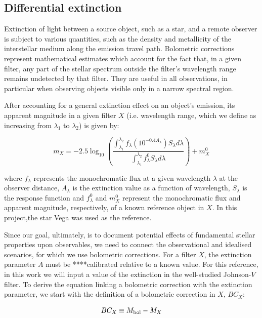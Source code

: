 \documentclass[usenatbib]{mnras}
\begin{document}
\subsection{Differential extinction}
Extinction of light between a source object, such as a star, and a remote observer is subject to various quantities, such as the density and metallicity of the interstellar medium along the emission travel path. Bolometric corrections represent mathematical estimates which account for the fact that, in a given filter, any part of the stellar spectrum outside the filter's wavelength range remains undetected by that filter. They are useful in all observations, in particular when observing objects visible only in a narrow spectral region.

After accounting for a general extinction effect on an object's emission, its apparent magnitude in a given filter $X$ (i.e. wavelength range, which we define as increasing from $\lambda _{1}$ to $\lambda _{2}$) is given by:

\begin{equation}
m_{X} = -2.5 \log_{10} \left(\frac{ \int_{\lambda_{1}}^{\lambda_{2}} f_{\lambda} \left( 10^{-0.4 A_{\lambda}} \right) S_{\lambda} d\lambda }{ \int_{\lambda_{1}}^{\lambda_{2}} f_{\lambda}^{0} S_{\lambda} d\lambda }\right) + m_{X}^{0}
\label{app_mag_def}
\end{equation}

where $f_{\lambda}$ represents the monochromatic flux at a given wavelength $\lambda$ at the observer distance, $A_{\lambda}$ is the extinction value as a function of wavelength, $S_{\lambda}$ is the response function and $f_{\lambda}^{0}$ and $m_{X}^{0}$ represent the monochromatic flux and apparent magnitude, respectively, of a known reference object in $X$. In this project,the star Vega was used as the reference.

Since our goal, ultimately, is to document potential effects of fundamental stellar properties upon observables, we need to connect the observational and idealised scenarios, for which we use bolometric corrections. For a filter $X$, the extinction parameter $A$ must be ****calibrated relative to a known value. For this reference, in this work we will input a value of the extinction in the well-studied Johnson-$V$ filter.
To derive the equation linking a bolometric correction with the extinction parameter, we start with the definition of a bolometric correction in $X$, $BC_{X}$:

\begin{equation}
BC_{X} \equiv M_{\textnormal{bol}} - M_{X}
\label{BC_def}
\end{equation}
\end{document}
